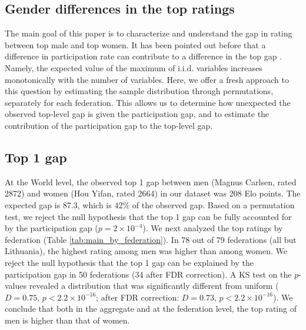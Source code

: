 \documentclass[9pt,twocolumn,twoside,lineno]{pnas-new}
\begin{document}
\subsection*{Gender differences in the top ratings}
The main goal of this paper is to characterize and understand the gap in rating between top male and top women. It has been pointed out before that a difference in participation rate can contribute to a difference in the top gap \cite{charness1996participation, chabris2006sex, bilalic2009best}. Namely, the expected value of the maximum of i.i.d. variables  increases monotonically with the number of variables. Here, we offer a fresh approach to this question by estimating the sample distribution through permutations, separately for each federation. This allows us to determine how unexpected the observed top-level gap is given the participation gap, and to estimate the contribution of the participation gap to the top-level gap.

\subsection*{Top 1 gap}
 At the World level, the observed top 1 gap between men (Magnus Carlsen, rated 2872) and women (Hou Yifan, rated 2664) in our dataset was 208 Elo points. The expected gap is 87.3, which is $42\%$ of the observed gap. Based on a permutation test, we reject the null hypothesis that the top 1 gap can be fully accounted for by the participation gap ($p=2\times 10^{-4}$).  We next analyzed the top ratings by federation (Table \ref{tab:main_by_federation}). In 78 out of 79 federations (all but Lithuania), the highest rating among men was higher than among women. We reject the null hypothesis that the top 1 gap can be explained by the participation gap in 50 federations (34 after FDR correction). A KS test on the $p$-values revealed a distribution that was significantly different from uniform ($D=0.75$, $p < 2.2\times 10^{-16}$; after FDR correction: $D=0.73$, $p < 2.2\times 10^{-16}$). We conclude that both in the aggregate and at the federation level, the top rating of men is higher than that of women.
\end{document}
